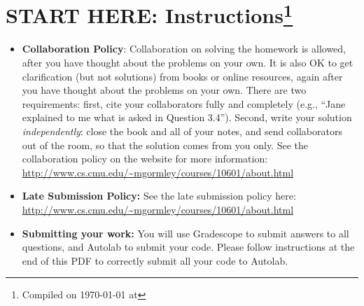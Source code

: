 \documentclass{article}
\begin{document}
\section*{START HERE: Instructions\footnote{Compiled on \today{} at \currenttime{}}}
\begin{itemize}

\item \textbf{Collaboration Policy}: Collaboration on solving the homework is allowed, after you have thought about the problems on your own. It is also OK to get clarification (but not solutions) from books or online resources, again after you have thought about the problems on your own. There are two requirements: first, cite your collaborators fully and completely (e.g., ``Jane explained to me what is asked in Question 3.4''). Second, write your solution {\em independently}: close the book and all of your notes, and send collaborators out of the room, so that the solution comes from you only.  See the collaboration policy on the website for more information: \url{http://www.cs.cmu.edu/~mgormley/courses/10601/about.html}
\item\textbf{Late Submission Policy:} See the late submission policy
  here:
  \url{http://www.cs.cmu.edu/~mgormley/courses/10601/about.html}

\item\textbf{Submitting your work:} You will use Gradescope to submit
  answers to all questions, and Autolab to submit your code. Please
  follow instructions at the end of this PDF to correctly submit all your code to Autolab.

  \begin{itemize}
    
\begin{comment}
  \item \textbf{Canvas:} Canvas (\url{https://canvas.cmu.edu}) will be
    used for quiz-style problems (e.g. multiple choice, true / false,
    numerical answers). Grading is done automatically.
    You may only \textbf{submit once} on canvas, so be sure of your
    answers before you submit. However, canvas allows you to work on
    your answers and then close out of the page and it will save your
    progress.  You will not be granted additional submissions, so
    please be confident of your solutions when you are submitting your
    assignment.
    {\color{red} The above is true for future assignments, but this one
    allows {\bf unlimited submissions}.}
\end{comment}
    

\end{itemize}
\end{itemize}
\end{document}

